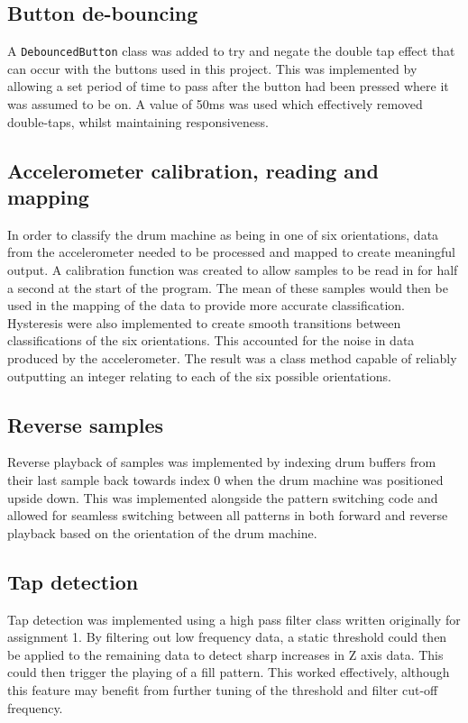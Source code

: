 \documentclass[titlepage]{scrartcl}
\begin{document}
\subsection{Button de-bouncing}
A \texttt{DebouncedButton} class was added to try and negate the double tap
effect that can occur with the buttons used in this project. This was
implemented by allowing a set period of time to pass after the button had been
pressed where it was assumed to be on. A value of 50ms was used which
effectively removed double-taps, whilst maintaining responsiveness.

\subsection{Accelerometer calibration, reading and mapping}
In order to classify the drum machine as being in one of six orientations, data
from the accelerometer needed to be processed and mapped to create meaningful
output. A calibration function was created to allow samples to be read in for
half a second at the start of the program. The mean of these samples would then
be used in the mapping of the data to provide more accurate classification.
Hysteresis were also implemented to create smooth transitions between
classifications of the six orientations. This accounted for the noise in data
produced by the accelerometer. The result was a class method capable of
reliably outputting an integer relating to each of the six possible orientations.

\subsection{Reverse samples}
Reverse playback of samples was implemented by indexing drum buffers from their
last sample back towards index 0 when the drum machine was positioned upside
down. This was implemented alongside the pattern switching code and allowed for
seamless switching between all patterns in both forward and reverse playback
based on the orientation of the drum machine.

\subsection{Tap detection}
Tap detection was implemented using a high pass filter class written originally
for assignment 1. By filtering out low frequency data, a static threshold could
then be applied to the remaining data to detect sharp increases in Z axis data.
This could then trigger the playing of a fill pattern. This worked effectively,
although this feature may benefit from further tuning of the threshold and
filter cut-off frequency.
\end{document}
